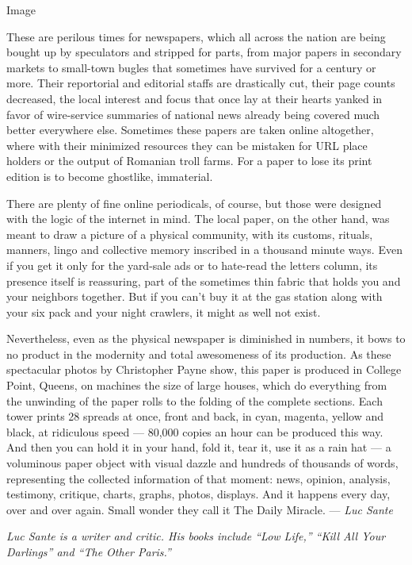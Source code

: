 Image

These are perilous times for newspapers, which all across the nation are
being bought up by speculators and stripped for parts, from major papers
in secondary markets to small-town bugles that sometimes have survived
for a century or more. Their reportorial and editorial staffs are
drastically cut, their page counts decreased, the local interest and
focus that once lay at their hearts yanked in favor of wire-service
summaries of national news already being covered much better everywhere
else. Sometimes these papers are taken online altogether, where with
their minimized resources they can be mistaken for URL place holders or
the output of Romanian troll farms. For a paper to lose its print
edition is to become ghostlike, immaterial.

There are plenty of fine online periodicals, of course, but those were
designed with the logic of the internet in mind. The local paper, on the
other hand, was meant to draw a picture of a physical community, with
its customs, rituals, manners, lingo and collective memory inscribed in
a thousand minute ways. Even if you get it only for the yard-sale ads or
to hate-read the letters column, its presence itself is reassuring, part
of the sometimes thin fabric that holds you and your neighbors together.
But if you can't buy it at the gas station along with your six pack and
your night crawlers, it might as well not exist.

Nevertheless, even as the physical newspaper is diminished in numbers,
it bows to no product in the modernity and total awesomeness of its
production. As these spectacular photos by Christopher Payne show, this
paper is produced in College Point, Queens, on machines the size of
large houses, which do everything from the unwinding of the paper rolls
to the folding of the complete sections. Each tower prints 28 spreads at
once, front and back, in cyan, magenta, yellow and black, at ridiculous
speed --- 80,000 copies an hour can be produced this way. And then you
can hold it in your hand, fold it, tear it, use it as a rain hat --- a
voluminous paper object with visual dazzle and hundreds of thousands of
words, representing the collected information of that moment: news,
opinion, analysis, testimony, critique, charts, graphs, photos,
displays. And it happens every day, over and over again. Small wonder
they call it The Daily Miracle. --- \emph{Luc Sante}

\emph{Luc Sante is a writer and critic. His books include ``Low Life,''
``Kill All Your Darlings'' and ``The Other Paris.''}

